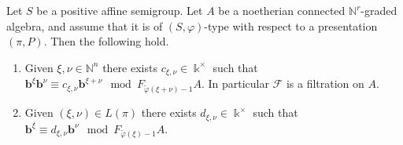 \documentclass[11pt,fleqn]{article}
\newcommand\NN{\mathbb N}
\renewcommand\phi{\varphi}
\newcommand\F{\mathcal F}
\newcommand\tphi{\tilde \phi}
\renewcommand\b{\mathbf b}
\renewcommand\k{\Bbbk}
\begin{document}
\begin{Lemma*}
Let $S$ be a positive affine semigroup. Let $A$ be a noetherian connected 
$\NN^r$-graded algebra, and assume that it is of $(S, \phi)$-type with respect 
to a presentation $(\pi, P)$. Then the following hold.
\begin{enumerate}
\item \label{filtration}
Given $\xi, \nu \in \NN^n$ there exists $c_{\xi, \nu} \in \k^\times$ such that 
$\b^\xi \b^\nu \equiv c_{\xi, \nu}\b^{\xi + \nu} \mod F_{\tphi(\xi + \nu) - 1}
A$. In particular $\F$ is a filtration on $A$.

\item \label{straight}
Given $(\xi, \nu) \in L(\pi)$ there exists $d_{\xi, \nu} \in \k^\times$ such 
that $\b^\xi \equiv d_{\xi, \nu} \b^\nu \mod F_{\tphi(\xi) - 1} A$.
\end{enumerate}
\end{Lemma*}
\end{document}
